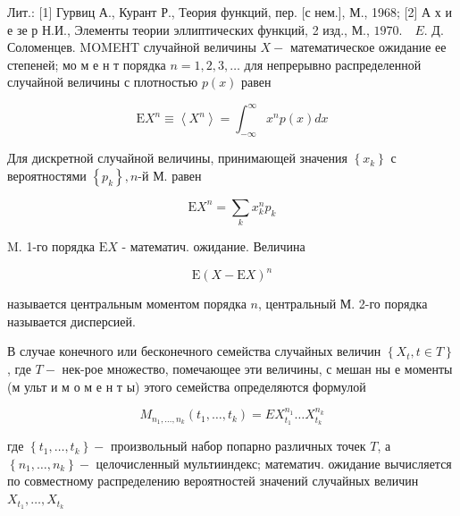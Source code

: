 \documentclass[10pt]{article}
\begin{document}
Лит.: [1] Гурвиц А., Курант Р., Теория функций, пер. [с нем.], М., 1968; [2] А х и е зе р Н.И., Элементы теории эллиптических функций, 2 изд., М., $1970 . \quad E$. Д. Соломенцев. MOMEHT случайной величины $X-$ математическое ожидание ее степеней; мо м е н т порядка $n=1,2,3, \ldots$ для непрерывно распределенной случайной величины с плотностью $p(x)$ равен



\[

\mathrm{E} X^{n} \equiv\left\langle X^{n}\right\rangle=\int_{-\infty}^{\infty} x^{n} p(x) d x

\]



Для дискретной случайной величины, принимающей значения $\left\{x_{k}\right\}$ с вероятностями $\left\{p_{k}\right\}, n$-й М. равен



\[

\mathrm{E} X^{n}=\sum_{k} x_{k}^{n} p_{k}

\]



M. 1-го порядка $\mathrm{E} X$ - математич. ожидание. Величина



\[

\mathrm{E}(X-\mathrm{E} X)^{n}

\]



называется центральным моментом порядка $n$, центральный М. 2-го порядка называется дисперсией.



В случае конечного или бесконечного семейства случайных величин $\left\{X_{t}, t \in T\right\}$, где $T-$ нек-рое множество, помечающее эти величины, с мешан ны е моменты (м ульт и м о м е н т ы) этого семейства определяются формулой



\[

M_{n_{1}, \ldots, n_{k}}\left(t_{1}, \ldots, t_{k}\right)=E X_{t_{1}}^{n_{1}} \ldots X_{t_{k}}^{n_{k}}

\]



где $\left\{t_{1}, \ldots, t_{k}\right\}-$ произвольный набор попарно различных точек $T$, а $\left\{n_{1}, \ldots, n_{k}\right\}-$ целочисленный мультииндекс; математич. ожидание вычисляется по совместному распределению вероятностей значений случайных величин $X_{t_{1}}, \ldots, X_{t_{k}}$
\end{document}
